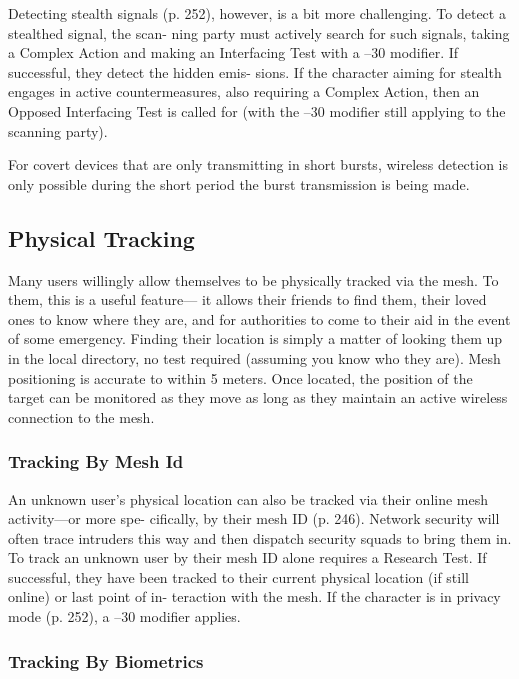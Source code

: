 Detecting stealth signals (p. 252), however, is a bit 
more challenging. To detect a stealthed signal, the scan-
ning party must actively search for such signals, taking 
a Complex Action and making an Interfacing Test with 
a –30 modifier. If successful, they detect the hidden emis-
sions. If the character aiming for stealth engages in active 
countermeasures, also requiring a Complex Action, then 
an Opposed Interfacing Test is called for (with the –30 
modifier still applying to the scanning party).

For covert devices that are only transmitting in 
short bursts, wireless detection is only possible during 
the short period the burst transmission is being made.

\subsection{Physical Tracking}

Many users willingly allow themselves to be physically 
tracked via the mesh. To them, this is a useful feature—
it allows their friends to find them, their loved ones to 
know where they are, and for authorities to come to 
their aid in the event of some emergency. Finding their 
location is simply a matter of looking them up in the 
local directory, no test required (assuming you know 
who they are). Mesh positioning is accurate to within 
5 meters. Once located, the position of the target can 
be monitored as they move as long as they maintain 
an active wireless connection to the mesh.

\subsubsection{Tracking By Mesh Id}

An unknown user's physical location can also be 
tracked via their online mesh activity—or more spe-
cifically, by their mesh ID (p. 246). Network security 
will often trace intruders this way and then dispatch 
security squads to bring them in. To track an unknown 
user by their mesh ID alone requires a Research Test. 
If successful, they have been tracked to their current 
physical location (if still online) or last point of in-
teraction with the mesh. If the character is in privacy 
mode (p. 252), a –30 modifier applies.

\subsubsection{Tracking By Biometrics}

